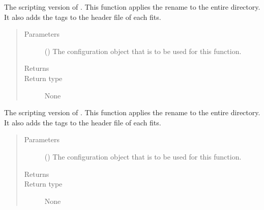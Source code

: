 \documentclass[letterpaper,10pt,english]{sphinxmanual}
\begin{document}

\begin{fulllineitems}
\label{\detokenize{docstrings/ifa_smeargle.reformat.renaming:ifa_smeargle.reformat.renaming.script_rename_set}}
The scripting version of . This function
applies the rename to the entire directory. It also adds the
tags to the header file of each fits.
\begin{quote}\begin{description}
\item[{Parameters}] \leavevmode
{} () \textendash{} The configuration object that is to be used for this
function.

\item[{Returns}] \leavevmode


\item[{Return type}] \leavevmode
None

\end{description}\end{quote}

\end{fulllineitems}


\begin{fulllineitems}
\label{\detokenize{docstrings/ifa_smeargle.reformat.renaming:ifa_smeargle.reformat.renaming.script_rename_voltage_pattern}}
The scripting version of . This
function applies the rename to the entire directory. It also
adds the tags to the header file of each fits.
\begin{quote}\begin{description}
\item[{Parameters}] \leavevmode
{} () \textendash{} The configuration object that is to be used for this
function.

\item[{Returns}] \leavevmode


\item[{Return type}] \leavevmode
None

\end{description}\end{quote}

\end{fulllineitems}
\end{document}
